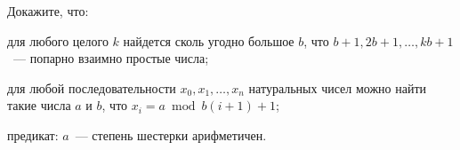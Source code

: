 Докажите, что:
\begin{enumcyr}
    \item для любого целого $k$ найдется сколь угодно большое $b$, что $b + 1, 2 b + 1, \dots, k b + 1$~--- попарно взаимно
	    простые числа;
    \item для любой последовательности $x_0, x_1, \dots, x_n$ натуральных чисел можно найти такие числа $a$ и $b$, что $x_i =
	    a \bmod b (i + 1) + 1$;
    \item предикат: $a$~--- степень шестерки арифметичен.
\end{enumcyr}